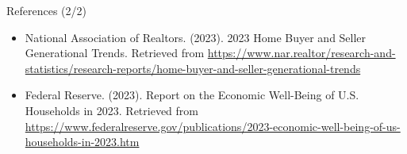 \documentclass{beamer}
\begin{document}
\begin{frame}{References (2/2)}
    \begin{itemize}
        \item National Association of Realtors. (2023). 2023 Home Buyer and Seller Generational Trends. Retrieved from \url{https://www.nar.realtor/research-and-statistics/research-reports/home-buyer-and-seller-generational-trends}
        \item Federal Reserve. (2023). Report on the Economic Well-Being of U.S. Households in 2023. Retrieved from \url{https://www.federalreserve.gov/publications/2023-economic-well-being-of-us-households-in-2023.htm}
    \end{itemize}
\end{frame}
\end{document}
